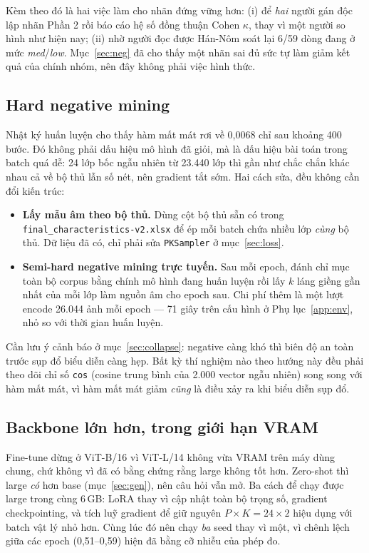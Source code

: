 \documentclass[conference,a4paper]{IEEEtran}
\newcommand{\code}[1]{{\small\texttt{#1}}}
\begin{document}
Kèm theo đó là hai việc làm cho nhãn đứng vững hơn: (i) để \emph{hai} người gán độc lập nhãn Phần 2
rồi báo cáo hệ số đồng thuận Cohen $\kappa$, thay vì một người so hình như hiện nay; (ii) nhờ người
đọc được Hán-Nôm soát lại 6/59 dòng đang ở mức \emph{med}/\emph{low}. Mục~\ref{sec:neg} đã cho thấy
một nhãn sai đủ sức tự làm giảm kết quả của chính nhóm, nên đây không phải việc hình thức.

\subsection{Hard negative mining}

Nhật ký huấn luyện cho thấy hàm mất mát rơi về 0,0068 chỉ sau khoảng 400 bước. Đó không phải dấu
hiệu mô hình đã giỏi, mà là dấu hiệu bài toán trong batch quá dễ: 24 lớp bốc ngẫu nhiên từ 23.440
lớp thì gần như chắc chắn khác nhau cả về bộ thủ lẫn số nét, nên gradient tắt sớm. Hai cách sửa,
đều không cần đổi kiến trúc:

\begin{itemize}
  \item \textbf{Lấy mẫu âm theo bộ thủ.} Dùng cột bộ thủ sẵn có trong
        \code{final\_characteristics-v2.xlsx} để ép mỗi batch chứa nhiều lớp \emph{cùng} bộ thủ. Dữ
        liệu đã có, chỉ phải sửa \code{PKSampler} ở mục~\ref{sec:loss}.
  \item \textbf{Semi-hard negative mining trực tuyến.} Sau mỗi epoch, đánh chỉ mục toàn bộ corpus
        bằng chính mô hình đang huấn luyện rồi lấy $k$ láng giềng gần nhất của mỗi lớp làm nguồn
        âm cho epoch sau. Chi phí thêm là một lượt encode 26.044 ảnh mỗi epoch --- 71 giây trên
        cấu hình ở Phụ lục~\ref{app:env}, nhỏ so với thời gian huấn luyện.
\end{itemize}

Cần lưu ý cảnh báo ở mục~\ref{sec:collapse}: negative càng khó thì biên độ an toàn trước sụp đổ
biểu diễn càng hẹp. Bất kỳ thí nghiệm nào theo hướng này đều phải theo dõi chỉ số \code{cos} (cosine
trung bình của 2.000 vector ngẫu nhiên) song song với hàm mất mát, vì hàm mất mát giảm \emph{cũng}
là điều xảy ra khi biểu diễn sụp đổ.

\subsection{Backbone lớn hơn, trong giới hạn VRAM}

Fine-tune dừng ở ViT-B/16 vì ViT-L/14 không vừa VRAM trên máy dùng chung, chứ không vì đã có bằng
chứng rằng large không tốt hơn. Zero-shot thì large \emph{có} hơn base (mục~\ref{sec:gen}), nên câu
hỏi vẫn mở. Ba cách để chạy được large trong cùng 6\,GB: LoRA thay vì cập nhật toàn bộ trọng số,
gradient checkpointing, và tích luỹ gradient để giữ nguyên $P \times K = 24 \times 2$ hiệu dụng với
batch vật lý nhỏ hơn. Cùng lúc đó nên chạy \emph{ba} seed thay vì một, vì chênh lệch giữa các epoch
(0,51--0,59) hiện đã bằng cỡ nhiễu của phép đo.
\end{document}
